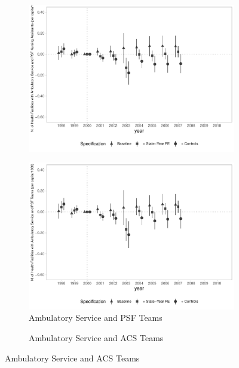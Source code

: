 \begin{figure}[h]
\begin{center}
\begin{subfigure}{0.24\textwidth}
        \includegraphics[width=\textwidth]{plots/infra/sia_ncnes_outpsf_pcapita_dist_ec29_baseline_dist_ec29_baseline_full.pdf}
    \end{subfigure}
    \begin{subfigure}{0.24\textwidth}
        \centering
        \caption{\tiny Ambulatory Service and PSF Teams}\label{fig:infra_n}
        \includegraphics[width=\textwidth]{plots/infra/sia_ncnes_psf_pcapita_dist_ec29_baseline_dist_ec29_baseline_full.pdf}
    \end{subfigure}
    \begin{subfigure}{0.24\textwidth}
        \centering
        \caption{\tiny Ambulatory Service and ACS Teams}\label{fig:infra_o}

\end{subfigure}
\end{center}
\end{figure}
